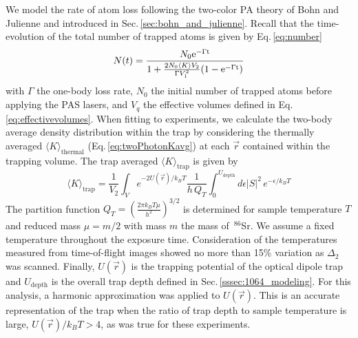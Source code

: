 We model the rate of atom loss following the two-color PA theory of Bohn and Julienne and introduced in Sec.\,\ref{sec:bohn_and_julienne}.
Recall that the time-evolution of the total number of trapped atoms is given by Eq.\,\ref{eq:number}
\begin{equation*} \label{eq:4num}
   N(t)= \frac{N_0 \rm{e}^{-\Gamma t}}
   		{ 1 + \frac{2 N_0 \langle K \rangle V_2}{\Gamma V_1^2}(1-\rm{e}^{-\Gamma t}) }
\end{equation*}
with $\Gamma$ the one-body loss rate, $N_0$ the initial number of trapped atoms before applying the PAS lasers, and $V_q$ the effective volumes defined in Eq.\,\ref{eq:effectivevolumes}.
When fitting to experiments, we calculate the two-body average density distribution within the trap by considering the thermally averaged $\langle K \rangle_{\text{thermal}}$ (Eq.\,\ref{eq:twoPhotonKavg}) at each $\vec{r}$ contained within the trapping volume.
The trap averaged $\langle K \rangle_\text{trap}$ is given by
\begin{equation} \label{eq:chap4avgK}
	\langle K \rangle_\text{trap} = \frac{1}{V_2} \int_V e^{-2 U(\vec{r})/k_{B}T} \frac{1}{h\,Q_{T}} \int_{0}^{U_\text{depth}} d\epsilon \vert S \vert^2 \,e^{-\epsilon/k_{B}T}
\end{equation}
The partition function $Q_{T}=\left( \frac{2\pi k_{B}T \mu}{ h^2 }\right) ^{3/2}$ is determined for sample temperature $T$ and reduced mass $\mu = m/2$ with mass $m$ the mass of $\,^{86}$Sr.
We assume a fixed temperature throughout the exposure time.
Consideration of the temperatures measured from time-of-flight images showed no more than 15\% variation as $\Delta_2$ was scanned.
Finally, $U(\vec{r})$ is the trapping potential of the optical dipole trap and $U_{\text{depth}}$ is the overall trap depth defined in Sec.\,\ref{sssec:1064_modeling}.
For this analysis, a harmonic approximation was applied to $U(\vec{r})$.
This is an accurate representation of the trap when the ratio of trap depth to sample temperature is large, $U(\vec{r})/k_B T > 4$, as was true for these experiments.


